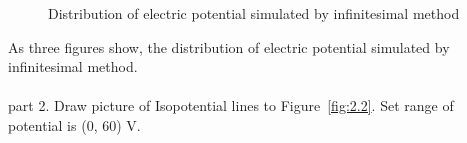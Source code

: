 \documentclass[10pt, journal, final]{IEEEtran}
\begin{document}
\begin{figure}[htbp]
    \centering

    \caption{Distribution of electric potential simulated by infinitesimal method}
    \label{fig:2.1}
\end{figure}
As three figures show, the distribution of electric potential simulated by infinitesimal method.\\
\\
part 2. Draw picture of Isopotential lines to Figure~\ref{fig:2.2}.
Set range of potential is (0, 60) V.

\end{document}
